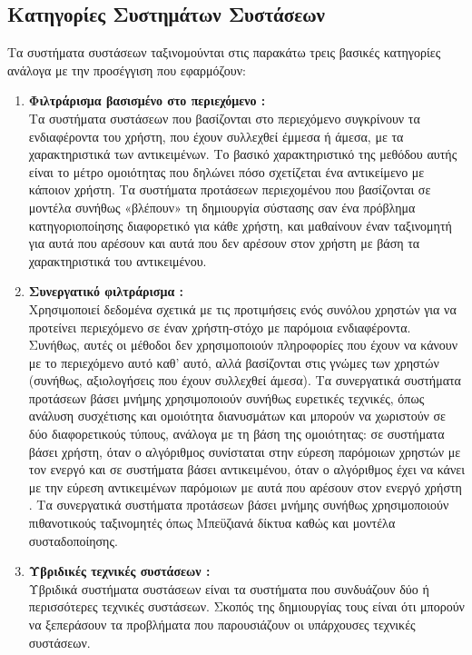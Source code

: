 \subsection{Κατηγορίες Συστημάτων Συστάσεων}

Τα συστήματα συστάσεων ταξινομούνται στις παρακάτω τρεις βασικές κατηγορίες ανάλογα με την προσέγγιση που εφαρμόζουν:
\begin{enumerate}
  \item  \textbf{Φιλτράρισμα βασισμένο στο περιεχόμενο {}:} \\
Τα συστήματα συστάσεων που βασίζονται στο
περιεχόμενο συγκρίνουν τα ενδιαφέροντα του χρήστη, που έχουν συλλεχθεί
έμμεσα ή άμεσα, με τα χαρακτηριστικά των αντικειμένων. Το βασικό
χαρακτηριστικό της μεθόδου αυτής είναι το μέτρο ομοιότητας που δηλώνει
πόσο σχετίζεται ένα αντικείμενο με κάποιον χρήστη. Τα συστήματα προτάσεων
περιεχομένου που βασίζονται σε μοντέλα συνήθως «βλέπουν» τη δημιουργία
σύστασης σαν ένα πρόβλημα κατηγοριοποίησης διαφορετικό για κάθε χρήστη,
και μαθαίνουν έναν ταξινομητή για αυτά που αρέσουν και αυτά που δεν
αρέσουν στον χρήστη με βάση τα χαρακτηριστικά του αντικειμένου.
  \item  \textbf{Συνεργατικό φιλτράρισμα {}:} \\
Χρησιμοποιεί δεδομένα σχετικά με τις προτιμήσεις
ενός συνόλου χρηστών για να προτείνει περιεχόμενο σε έναν χρήστη-στόχο με
παρόμοια ενδιαφέροντα. Συνήθως, αυτές οι μέθοδοι δεν χρησιμοποιούν
πληροφορίες που έχουν να κάνουν με το περιεχόμενο αυτό καθ' αυτό, αλλά
βασίζονται στις γνώμες των χρηστών (συνήθως, αξιολογήσεις που έχουν
συλλεχθεί άμεσα). Τα συνεργατικά συστήματα προτάσεων βάσει μνήμης
χρησιμοποιούν συνήθως ευρετικές τεχνικές, όπως ανάλυση συσχέτισης και
ομοιότητα διανυσμάτων και μπορούν να χωριστούν σε δύο διαφορετικούς
τύπους, ανάλογα με τη βάση της ομοιότητας: σε συστήματα βάσει χρήστη, όταν
ο αλγόριθμος συνίσταται στην εύρεση παρόμοιων χρηστών με τον ενεργό και σε
συστήματα βάσει αντικειμένου, όταν ο αλγόριθμος έχει να κάνει με την εύρεση
αντικειμένων παρόμοιων με αυτά που αρέσουν στον ενεργό χρήστη . Τα
συνεργατικά συστήματα προτάσεων βάσει μνήμης συνήθως χρησιμοποιούν
πιθανοτικούς ταξινομητές όπως Μπεϋζιανά δίκτυα καθώς και μοντέλα
συσταδοποίησης.
  \item  \textbf{Υβριδικές τεχνικές συστάσεων {}:} \\
Υβριδικά συστήματα συστάσεων είναι τα συστήματα που συνδυάζουν δύο ή
περισσότερες τεχνικές συστάσεων. Σκοπός της δημιουργίας τους είναι ότι μπορούν να
ξεπεράσουν τα προβλήματα που παρουσιάζουν οι υπάρχουσες τεχνικές συστάσεων.
\end{enumerate}

